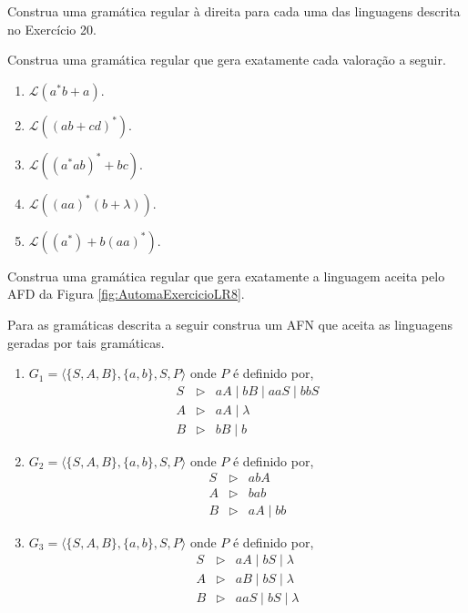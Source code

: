 \begin{problemset}
	\item Construa uma gramática regular à direita para cada uma das linguagens descrita no Exercício 20.
	
	\item Construa uma gramática regular que gera exatamente cada valoração a seguir.
	\begin{enumerate}
		\item $\mathcal{L}(a^*b + a)$.
		\item $\mathcal{L}((ab + cd)^*)$.
		\item $\mathcal{L}((a^*ab)^* + bc)$.
		\item $\mathcal{L}((aa)^* (b + \lambda))$.
		\item $\mathcal{L}((a^*) + b(aa)^*)$.
	\end{enumerate}

	\item Construa uma gramática regular que gera exatamente a linguagem aceita pelo AFD da Figura \ref{fig:AutomaExercicioLR8}.
	
	\item Para as gramáticas descrita a seguir construa um AFN que aceita as linguagens geradas por tais gramáticas. 
	\begin{enumerate}
		\item $G_1 = \langle \{S, A, B\},\{a, b\}, S, P \rangle$ onde $P$ é definido por, 
		\begin{eqnarray*}
			S & \rhd & aA \mid bB \mid aaS \mid bbS\\
			A & \rhd & aA \mid \lambda \\
			B & \rhd & bB \mid b
		\end{eqnarray*}
		
		\item $G_2 = \langle \{S, A, B\},\{a, b\}, S, P \rangle$ onde $P$ é definido por, 
		\begin{eqnarray*}
			S & \rhd & abA\\
			A & \rhd & bab\\
			B & \rhd & aA \mid bb
		\end{eqnarray*}
		
		\item $G_3 = \langle \{S, A, B\},\{a, b\}, S, P \rangle$ onde $P$ é definido por, 
		\begin{eqnarray*}
			S & \rhd & aA \mid bS \mid \lambda\\
			A & \rhd & aB \mid bS \mid \lambda \\
			B & \rhd & aaS \mid bS \mid \lambda 
		\end{eqnarray*}
		

\end{enumerate}
\end{problemset}
